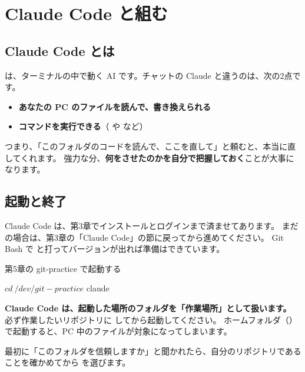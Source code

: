 \chapter{Claude Code と組む}

\section{Claude Code とは}

 は、ターミナルの中で動く AI です。チャットの Claude と違うのは、次の2点です。

\begin{itemize}
  \item \textbf{あなたの PC のファイルを読んで、書き換えられる}
  \item \textbf{コマンドを実行できる}（ や  など）
\end{itemize}

つまり、「このフォルダのコードを読んで、ここを直して」と頼むと、本当に直してくれます。
強力な分、\textbf{何をさせたのかを自分で把握しておく}ことが大事になります。

\section{起動と終了}

Claude Code は、第3章でインストールとログインまで済ませてあります。
まだの場合は、第3章の「Claude Code」の節に戻ってから進めてください。
Git Bash で  と打ってバージョンが出れば準備はできています。

\begin{step}{第5章の git-practice で起動する}
\begin{terminal}
$ cd ~/dev/git-practice
$ claude
\end{terminal}
\textbf{Claude Code は、起動した場所のフォルダを「作業場所」として扱います。}
必ず作業したいリポジトリに  してから起動してください。
ホームフォルダ（\code{\textasciitilde}）で起動すると、PC 中のファイルが対象になってしまいます。
\end{step}

最初に「このフォルダを信頼しますか」と聞かれたら、自分のリポジトリであることを確かめてから  を選びます。

